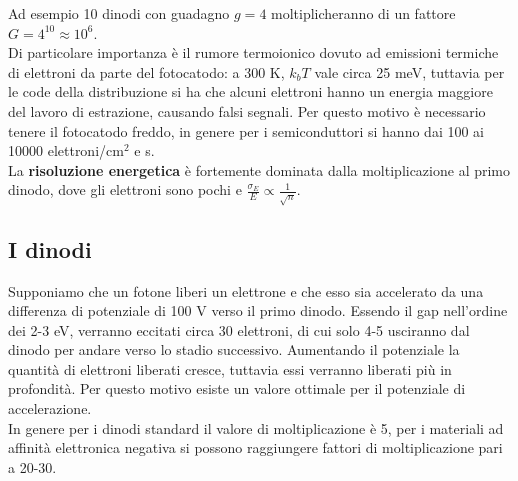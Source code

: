 Ad esempio 10 dinodi con guadagno $g=4$ moltiplicheranno di un fattore $G=4^{10}\approx 10^6$.\\
Di particolare importanza \`e il rumore termoionico dovuto ad emissioni termiche di elettroni da parte del fotocatodo:
a 300 K, $k_b T$ vale circa 25 meV, tuttavia per le code della distribuzione si ha che alcuni elettroni hanno un energia maggiore del lavoro di estrazione, 
causando falsi segnali.
Per questo motivo \`e necessario tenere il fotocatodo freddo, in genere per i semiconduttori si hanno dai 100 ai 10000 elettroni/cm$^2$ e s.\\
La \textbf{risoluzione energetica} \`e fortemente dominata dalla moltiplicazione al primo dinodo, dove gli elettroni sono pochi e 
$\frac{\sigma_E}{E} \propto \frac{1}{\sqrt{n}}$.
\subsection{I dinodi}
Supponiamo che un fotone liberi un elettrone e che esso sia accelerato da una differenza di potenziale di 100 V verso il primo dinodo.
Essendo il gap nell'ordine dei 2-3 eV, verranno eccitati circa 30 elettroni, di cui solo 4-5 usciranno dal dinodo per andare verso lo stadio successivo.
Aumentando il potenziale la quantit\`a di elettroni liberati cresce, tuttavia essi verranno liberati pi\`u in profondit\`a.
Per questo motivo esiste un valore ottimale per il potenziale di accelerazione.\\
In genere per i dinodi standard il valore di moltiplicazione \`e 5, per i materiali ad affinit\`a elettronica negativa si possono raggiungere fattori di moltiplicazione
pari a 20-30.

